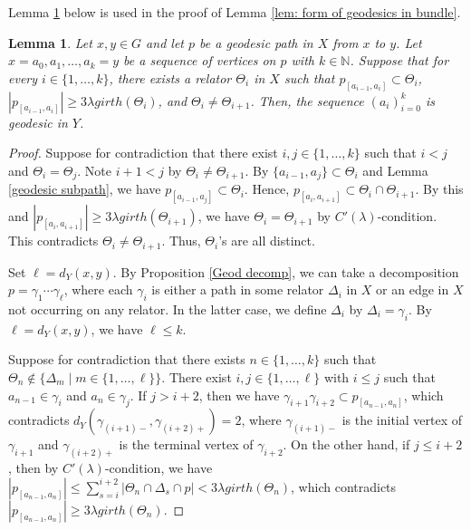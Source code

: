 \documentclass{article}[11pt]
\newtheorem{lem}[thm]{Lemma}
\newcommand{\N}{\mathbb{N}}
\begin{document}
{{\color{black}

Lemma \ref{lem:big relators form geod} below is used in the proof of Lemma \ref{lem: form of geodesics in bundle}.

    \begin{lem}\label{lem:big relators form geod}
        Let $x,y \in G$ and let $p$ be a geodesic path in $X$ from $x$ to $y$. Let $x=a_0,a_1,\ldots,a_k=y$ be a sequence of vertices on $p$ with $k\in \N$. Suppose that for every $i \in \{1,\ldots,k\}$, there exists a relator $\Theta_i$ in $X$ such that $p_{[a_{i-1},a_i]} \subset \Theta_i$, $|p_{[a_{i-1},a_i]}| \ge 3\lambda girth(\Theta_i)$, and $\Theta_i \neq \Theta_{i+1}$. Then, the sequence $(a_i)_{i=0}^k$ is geodesic in $Y$.
    \end{lem}

    \begin{proof}
        Suppose for contradiction that there exist $i,j \in \{1,\ldots,k\}$ such that $i < j$ and $\Theta_i = \Theta_j$. Note $i+1<j$ by $\Theta_i \neq \Theta_{i+1}$. By $\{a_{i-1},a_j\} \subset \Theta_i$ and Lemma \ref{geodesic subpath}, we have $p_{[a_{i-1},a_j]} \subset \Theta_i$. Hence, $p_{[a_i,a_{i+1}]} \subset \Theta_i \cap \Theta_{i+1}$. By this and $|p_{[a_i, a_{i+1}]}| \ge 3\lambda girth(\Theta_{i+1})$, we have $\Theta_i = \Theta_{i+1}$ by $C'(\lambda)$-condition. This contradicts $\Theta_i \neq \Theta_{i+1}$. Thus, $\Theta_i$'s are all distinct.

    Set $\ell=d_Y(x,y)$. By Proposition \ref{Geod decomp}, we can take a decomposition $p = \gamma_{1} \cdots \gamma_{\ell}$, where each $\gamma_{i}$ is either a path in some relator $\Delta_i$ in $X$ or an edge in $X$ not occurring on any relator. In the latter case, we define $\Delta_i$ by $\Delta_i = \gamma_i$. By $\ell=d_Y(x,y)$, we have $\ell \le k$.

    Suppose for contradiction that there exists $n \in \{1,\ldots,k\}$ such that $\Theta_n \notin \{\Delta_m \mid m \in \{1,\ldots,\ell\}\}$. There exist $i,j \in \{1,\ldots,\ell\}$ with $i \le j$ such that $a_{n-1}\in \gamma_i$ and $a_n \in \gamma_j$. If $j>i+2$, then we have $\gamma_{i+1}\gamma_{i+2} \subset p_{[a_{n-1},a_n]}$, which contradicts $d_Y(\gamma_{(i+1)-},\gamma_{(i+2)+})=2$, where $\gamma_{(i+1)-}$ is the initial vertex of $\gamma_{i+1}$ and $\gamma_{(i+2)+}$ is the terminal vertex of $\gamma_{i+2}$. On the other hand, if $j \le i+2$, then by $C'(\lambda)$-condition, we have $|p_{[a_{n-1},a_n]}| \le \sum_{s=i}^{i+2}|\Theta_n \cap\Delta_s \cap p| < 3\lambda girth(\Theta_n)$, which contradicts $|p_{[a_{n-1},a_n]}| \ge 3\lambda girth(\Theta_n)$.


\end{proof}}}
\end{document}
